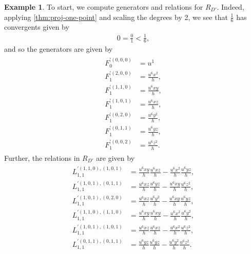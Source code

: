 \documentclass{amsart}
\theoremstyle{plain}
\theoremstyle{definition}
\newtheorem{example}[thm]{Example}
\theoremstyle{remark}
\numberwithin{equation}{section}
\begin{document}
\begin{example}
	To start, we compute generators and relations for $R_{D'}$.
	Indeed, applying \ref{thm:proj-one-point} and scaling
	the degrees by 2, we see that $\frac{1}{6}$ has convergents
	given by
	\begin{align*}
		0 = \frac{0}{1} < \frac{1}{6},
	\end{align*}
	and so the generators are given by 
	\begin{align}
	\begin{aligned}
	\label{equation:d'-generators}
		F_0^{'(0,0,0)} &= u^1 \\
		F_1^{'(2,0,0)} &= \frac{u^6 x^2}{h}, \\
		F_1^{'(1,1,0)} &= \frac{u^6 xy}{h}, \\ 
		F_1^{'(1,0,1)} &= \frac{u^6 xz}{h}, \\
		F_1^{'(0,2,0)} &= \frac{u^6 y^2}{h}, \\
		F_1^{'(0,1,1)} &= \frac{u^6 yz}{h},  \\
		F_1^{'(0,0,2)} &= \frac{u^6 z^2}{h}.
	\end{aligned}
	\end{align}
Further, the relations in $R_{D'}$ are given by 	
\begin{align}	
			\begin{aligned}
	\label{equation:d'-relations}
		L_{1,1}^{'(1,1,0), (1,0,1)} &= \frac{u^6 xy}{h}\frac{u^6 xz}{h} - \frac{u^6x^2}{h}\frac{u^6yz}{h},\\
		L_{1,1}^{'(1,0,1), (0,1,1)} &= \frac{u^6 xz}{h}\frac{u^6 yz}{h} - \frac{u^6xy}{h}\frac{u^6z^2}{h},\\
		L_{1,1}^{'(1,0,1), (0,2,0)} &= \frac{u^6 xz}{h}\frac{u^6 y^2}{h} - \frac{u^6xy}{h}\frac{u^6yz}{h}, \\
		L_{1,1}^{'(1,1,0), (1,1,0)} &= \frac{u^6 xy}{h}\frac{u^6 xy}{h} - \frac{u^6x^2}{h}\frac{u^6y^2}{h}, \\
		L_{1,1}^{'(1,0,1), (1,0,1)} &= \frac{u^6 xz}{h}\frac{u^6 xz}{h} - \frac{u^6x^2}{h}\frac{u^6z^2}{h}, \\
		L_{1,1}^{'(0,1,1), (0,1,1)} &= \frac{u^6 yz}{h}\frac{u^6 yz}{h} - \frac{u^6y^2}{h}\frac{u^6z^2}{h}.
\end{aligned}
\end{align}


\end{example}
\end{document}
